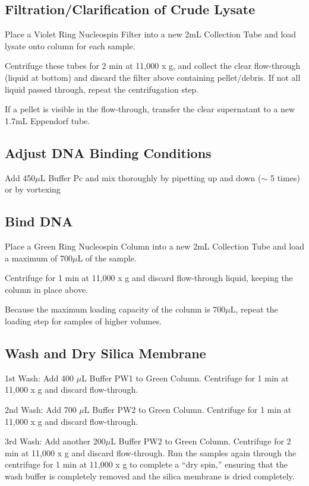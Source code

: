 \documentclass[12pt]{../SOP3_alpha}\usepackage[]{graphicx}\usepackage[]{color}
\begin{document}
\subsection*{Filtration/Clarification of Crude Lysate}

\NP Place a Violet Ring Nucleospin Filter into a new 2mL Collection Tube and load lysate onto column for each sample. 

\NP Centrifuge these tubes for 2 min at 11,000 x g, and collect the clear flow-through (liquid at bottom) and discard the filter above containing pellet/debris. If not all liquid passed through, repeat the centrifugation step.

\NP If a pellet is visible in the flow-through, transfer the clear supernatant to a new 1.7mL Eppendorf tube. 


\subsection*{Adjust DNA Binding Conditions}

\NP Add 450$\mu$L Buffer Pc and mix thoroughly by pipetting up and down ($\sim$ 5 times) or by vortexing


\subsection*{Bind DNA}

\NP Place a Green Ring Nucleospin Column into a new 2mL Collection Tube and load a maximum of 700$\mu$L of the sample.

\NP Centrifuge for 1 min at 11,000 x g and discard flow-through liquid, keeping the column in place above. 

\NP Because the maximum loading capacity of the column is 700$\mu$L, repeat the loading step for samples of higher volumes.

\subsection*{Wash and Dry Silica Membrane}

\NP 1st Wash: Add 400 $\mu$L Buffer PW1 to Green Column. Centrifuge for 1 min at 11,000 x g and discard flow-through.

\NP 2nd Wash: Add 700 $\mu$L Buffer PW2 to Green Column. Centrifuge for 1 min at 11,000 x g and discard flow-through.

\NP 3rd Wash: Add another 200$\mu$L Buffer PW2 to Green Column. Centrifuge for 2 min at 11,000 x g and discard flow-through. Run the samples again through the centrifuge for 1 min at 11,000 x g to complete a ``dry spin,'' ensuring that the wash buffer is completely removed and the silica membrane is dried completely. 
\end{document}
